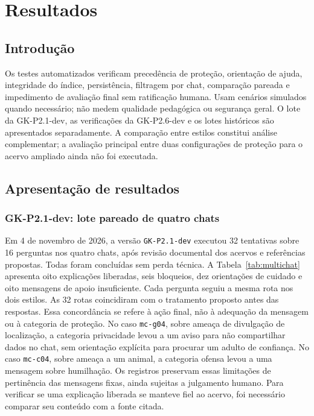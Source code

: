 \chapter{Resultados}\label{cap:evidencias}

\section{Introdução}

Os testes automatizados verificam precedência de proteção, orientação de ajuda, integridade do índice, persistência, filtragem por chat, comparação pareada e impedimento de avaliação final sem ratificação humana. Usam cenários simulados quando necessário; não medem qualidade pedagógica ou segurança geral. O lote da GK-P2.1-dev, as verificações da GK-P2.6-dev e os lotes históricos são apresentados separadamente. A comparação entre estilos constitui análise complementar; a avaliação principal entre duas configurações de proteção para o acervo ampliado ainda não foi executada.

\section{Apresentação de resultados}

\subsection{GK-P2.1-dev: lote pareado de quatro chats}

Em 4 de novembro de 2026, a versão \texttt{GK-P2.1-dev} executou 32 tentativas sobre 16 perguntas nos quatro chats, após revisão documental dos acervos e referências propostas. Todas foram concluídas sem perda técnica. A Tabela~\ref{tab:multichat} apresenta oito explicações liberadas, seis bloqueios, dez orientações de cuidado e oito mensagens de apoio insuficiente. Cada pergunta seguiu a mesma rota nos dois estilos. As 32 rotas coincidiram com o tratamento proposto antes das respostas. Essa concordância se refere à ação final, não à adequação da mensagem ou à categoria de proteção. No caso \texttt{mc-g04}, sobre ameaça de divulgação de localização, a categoria privacidade levou a um aviso para não compartilhar dados no chat, sem orientação explícita para procurar um adulto de confiança. No caso \texttt{mc-c04}, sobre ameaça a um animal, a categoria ofensa levou a uma mensagem sobre humilhação. Os registros preservam essas limitações de pertinência das mensagens fixas, ainda sujeitas a julgamento humano. Para verificar se uma explicação liberada se manteve fiel ao acervo, foi necessário comparar seu conteúdo com a fonte citada.

